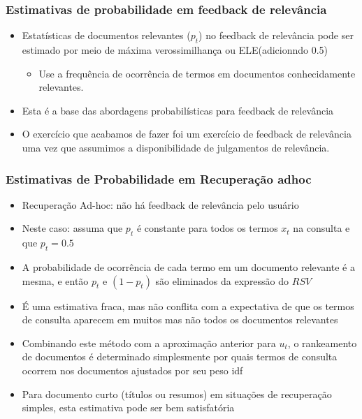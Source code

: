 \documentclass[compress]{beamer}
\begin{document}
\begin{frame}[<+->]
\frametitle{Estimativas de probabilidade em feedback de relevância}
\pause[2]

\begin{itemize}
\item Estatísticas de documentos relevantes ($p_t$) no feedback de relevância pode ser estimado por meio de máxima verossimilhança ou ELE(adicionndo 0.5)
\begin{itemize}
\item Use a frequência de ocorrência de termos em documentos conhecidamente relevantes. 
\end{itemize}
\item Esta é a base das abordagens probabilísticas para feedback de relevância 
\item O exercício que acabamos de fazer foi um exercício de feedback de relevância uma vez que assumimos a disponibilidade de julgamentos de relevância.
\end{itemize}

\end{frame}

\begin{frame}[<+->]
\frametitle{Estimativas de Probabilidade em Recuperação adhoc }
\pause[2]

\begin{itemize}
\item Recuperação Ad-hoc: não há feedback de relevância pelo usuário
\item Neste caso: assuma que $p_t$ é constante para todos os termos $x_t$ na consulta e que  $p_t = 0.5$ 
\item A probabilidade de ocorrência de cada termo em um documento relevante é a mesma, e então $p_t$ e $(1-p_t)$ são eliminados da expressão do $RSV$ 

\item É uma estimativa fraca, mas não conflita com a expectativa  de que os termos de consulta aparecem em muitos mas não todos os documentos relevantes

\item Combinando este método com a aproximação anterior para $u_t$, o rankeamento de documentos é determinado simplesmente por quais termos de consulta ocorrem nos documentos ajustados por seu peso idf

\item Para documento curto (títulos ou resumos) em situações de recuperação simples, esta estimativa pode ser bem satisfatória
\end{itemize}
\end{frame}
\end{document}
